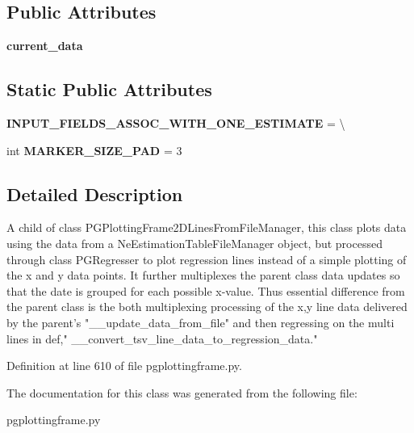 \subsection*{Public Attributes}
\begin{DoxyCompactItemize}
\item 
{\bfseries current\+\_\+data}\hypertarget{classnegui_1_1pgplottingframe_1_1PGPlottingFrameRegressionLinesFromFileManager_ae363456ebb3b83eab8083372b659b0b6}{}\label{classnegui_1_1pgplottingframe_1_1PGPlottingFrameRegressionLinesFromFileManager_ae363456ebb3b83eab8083372b659b0b6}

\end{DoxyCompactItemize}
\subsection*{Static Public Attributes}
\begin{DoxyCompactItemize}
\item 
{\bfseries I\+N\+P\+U\+T\+\_\+\+F\+I\+E\+L\+D\+S\+\_\+\+A\+S\+S\+O\+C\+\_\+\+W\+I\+T\+H\+\_\+\+O\+N\+E\+\_\+\+E\+S\+T\+I\+M\+A\+TE} = \textbackslash{}\hypertarget{classnegui_1_1pgplottingframe_1_1PGPlottingFrameRegressionLinesFromFileManager_a00b2193469e0f556979e5d3c6a3c1f6c}{}\label{classnegui_1_1pgplottingframe_1_1PGPlottingFrameRegressionLinesFromFileManager_a00b2193469e0f556979e5d3c6a3c1f6c}

\item 
int {\bfseries M\+A\+R\+K\+E\+R\+\_\+\+S\+I\+Z\+E\+\_\+\+P\+AD} = 3\hypertarget{classnegui_1_1pgplottingframe_1_1PGPlottingFrameRegressionLinesFromFileManager_a43f26409c5015ce16d878640d4b588d7}{}\label{classnegui_1_1pgplottingframe_1_1PGPlottingFrameRegressionLinesFromFileManager_a43f26409c5015ce16d878640d4b588d7}

\end{DoxyCompactItemize}


\subsection{Detailed Description}
\begin{DoxyVerb}A child of class PGPlottingFrame2DLinesFromFileManager, this class plots data using 
the data from a NeEstimationTableFileManager object, but processed through
class PGRegresser to plot regression lines instead of a simple plotting of
the x and y data points.  It further multiplexes the parent class data updates so
that the date is grouped for each possible x-value. Thus essential difference 
from the parent class is the both multiplexing processing of the x,y line data  
delivered by the parent's "__update_data_from_file"  and then regressing on 
the multi lines in def," __convert_tsv_line_data_to_regression_data."
\end{DoxyVerb}
 

Definition at line 610 of file pgplottingframe.\+py.



The documentation for this class was generated from the following file\+:\begin{DoxyCompactItemize}
\item 
pgplottingframe.\+py\end{DoxyCompactItemize}
